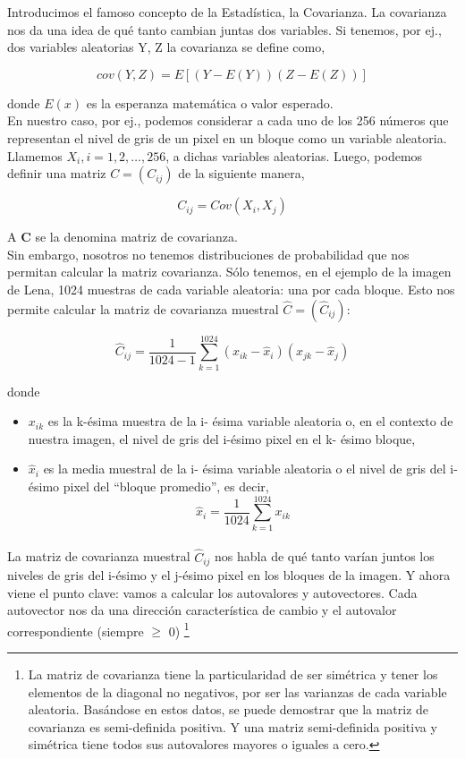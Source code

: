 \documentclass[twocolumn,a4paper,10pt]{article}
\begin{document}
Introducimos el famoso concepto de la Estadística, la Covarianza. La covarianza nos da una idea de qu\'e tanto cambian juntas dos variables. Si tenemos, por ej., 
dos variables aleatorias Y, Z la covarianza se define como,

\[ cov(Y, Z) = E [(Y - E(Y )) (Z - E(Z))] \]

donde $E(x)$ es la esperanza matem\'atica o valor esperado. \\

En nuestro caso, por ej., podemos considerar a cada uno de los 256 n\'umeros que representan el nivel de gris de un pixel en un bloque como un variable aleatoria.
Llamemos $X_{i}, i = 1, 2, \dotsc, 256$, a dichas variables aleatorias. Luego, podemos definir una matriz $C = (C_{ij} )$ de la siguiente manera,

\[C_{ij} = Cov(X_{i}, X_{j})  \]

A $\textbf{C}$ se la denomina matriz de covarianza.\\

Sin embargo, nosotros no tenemos distribuciones de probabilidad que nos permitan calcular la matriz covarianza. S\'olo tenemos, en el ejemplo de la imagen
de Lena, 1024 muestras de cada variable aleatoria: una por cada bloque. Esto nos permite calcular la matriz de covarianza muestral $\widehat{C} = (\widehat{C}_{ij})$:

\[ \widehat{C}_{ij} =  \frac{1}{1024 - 1}\sum_{k=1}^{1024} (x_{ik} - \widehat{x}_{i}) (x_{jk} - \widehat{x}_{j}) \]

donde
\begin{itemize}
    \item $x_{ik}$ es la k-\'esima muestra de la i- \'esima variable aleatoria o, en el contexto de nuestra imagen, el nivel de gris del i-\'esimo pixel en el 
    k- \'esimo bloque,
    \item $\widehat{x}_{i}$ es la media muestral de la i- \'esima variable aleatoria o el nivel de gris del i-\'esimo pixel del “bloque promedio”, es decir,
    \[ \widehat{x}_{i} = \frac{1}{1024} \sum_{k=1}^{1024} x_{ik} \]
\end{itemize}

\paragraph*{}

La matriz de covarianza muestral $\widehat{C}_{ij}$ nos habla de qu\'e tanto var\'ian juntos los niveles de gris del i-\'esimo y el j-\'esimo pixel en los bloques 
de la imagen. Y ahora viene  el punto clave: vamos a calcular los autovalores y autovectores. Cada autovector nos da una direcci\'on caracter\'istica de cambio y 
el autovalor correspondiente  (siempre $\geq$ 0) \footnote{La matriz de covarianza tiene la particularidad de ser sim\'etrica y tener los elementos de la diagonal no negativos, por ser las 
varianzas de cada variable aleatoria. Bas\'andose en estos datos, se puede demostrar que la matriz de covarianza es semi-definida positiva. Y una matriz semi-definida 
positiva y sim\'etrica tiene todos sus autovalores mayores o iguales a cero.}
\end{document}
